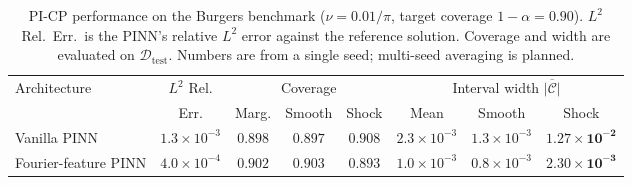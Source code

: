 \documentclass[11pt]{article}
\theoremstyle{definition}
\theoremstyle{remark}
\newcommand{\Dtest}{\mathcal{D}_{\text{test}}}
\begin{document}
\begin{table}[h]
\centering
\caption{PI-CP performance on the Burgers benchmark ($\nu = 0.01/\pi$, target coverage $1{-}\alpha = 0.90$). $L^2$ Rel.\ Err.\ is the PINN's relative $L^2$ error against the reference solution. Coverage and width are evaluated on $\Dtest$. Numbers are from a single seed; multi-seed averaging is planned.}
\label{tab:main}
\small
\begin{tabular}{lccccccc}
\toprule
\multirow{2}{*}{Architecture} & $L^2$ Rel. & \multicolumn{3}{c}{Coverage} & \multicolumn{3}{c}{Interval width $\overline{|\mathcal{C}|}$} \\
\cmidrule(lr){3-5}\cmidrule(lr){6-8}
 & Err. & Marg. & Smooth & Shock & Mean & Smooth & Shock \\
\midrule
Vanilla PINN          & $1.3\!\times\!10^{-3}$ & $0.898$ & $0.897$ & $\mathbf{0.908}$ & $2.3\!\times\!10^{-3}$ & $1.3\!\times\!10^{-3}$ & $\mathbf{1.27\!\times\!10^{-2}}$ \\
Fourier-feature PINN  & $4.0\!\times\!10^{-4}$ & $0.902$ & $0.903$ & $\mathbf{0.893}$ & $1.0\!\times\!10^{-3}$ & $0.8\!\times\!10^{-3}$ & $\mathbf{2.30\!\times\!10^{-3}}$ \\
\bottomrule
\end{tabular}
\end{table}
\end{document}
